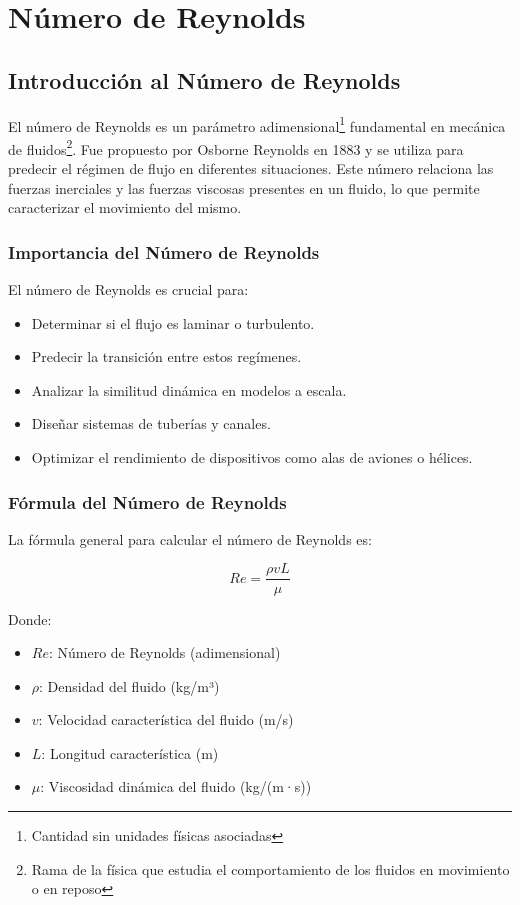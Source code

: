 \documentclass[../main]{subfiles}
\begin{document}
\chapter{Número de Reynolds}

\section{Introducción al Número de Reynolds}

El número de Reynolds es un parámetro adimensional\footnote{Cantidad sin unidades físicas asociadas} fundamental en mecánica de fluidos\footnote{Rama de la física que estudia el comportamiento de los fluidos en movimiento o en reposo}. Fue propuesto por Osborne Reynolds en 1883 y se utiliza para predecir el régimen de flujo en diferentes situaciones. Este número relaciona las fuerzas inerciales y las fuerzas viscosas presentes en un fluido, lo que permite caracterizar el movimiento del mismo.

\subsection{Importancia del Número de Reynolds}

El número de Reynolds es crucial para:

\begin{itemize}
    \item Determinar si el flujo es laminar o turbulento.
    \item Predecir la transición entre estos regímenes.
    \item Analizar la similitud dinámica en modelos a escala.
    \item Diseñar sistemas de tuberías y canales.
    \item Optimizar el rendimiento de dispositivos como alas de aviones o hélices.
\end{itemize}

\subsection{Fórmula del Número de Reynolds}

La fórmula general para calcular el número de Reynolds es:

\begin{equation}
    Re = \frac{\rho v L}{\mu}
\end{equation}

Donde:
\begin{itemize}
    \item $Re$: Número de Reynolds (adimensional)
    \item $\rho$: Densidad del fluido (kg/m³)
    \item $v$: Velocidad característica del fluido (m/s)
    \item $L$: Longitud característica (m)
    \item $\mu$: Viscosidad dinámica del fluido (kg/(m·s))
\end{itemize}
\end{document}
